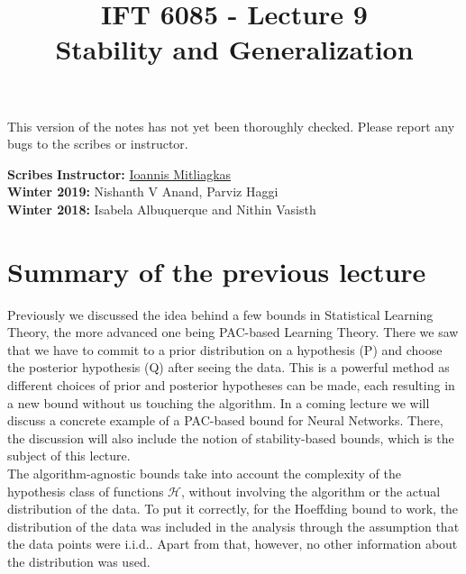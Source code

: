 \documentclass{article}
\title{IFT 6085 - Lecture 9 \\ Stability and Generalization}
\date{}
\begin{document}
 

\maketitle

\vspace{-0.5in}
\begin{center}
This version of the notes has not yet been thoroughly checked.
Please report any bugs to the scribes or instructor.
\end{center}
\vspace{0.2in}

\textbf{Scribes}\hfill
\textbf{Instructor:}  {\href{https://mitliagkas.github.io/}{Ioannis Mitliagkas}}\\
\textbf{Winter 2019:} Nishanth V Anand, Parviz Haggi\\
\textbf{Winter 2018:} Isabela Albuquerque and Nithin Vasisth



\newcommand{\infgc}{\inf_{g \in \mathcal{C}}}
\newcommand{\supgc}{\sup_{g \in \mathcal{C}}}

\newcommand{\Prob}{\mathbb{P}}
\newcommand{\E}{\mathbb{E}}
\newcommand{\reals}{\mathbb{R}}

\section{Summary of the previous lecture}
Previously we discussed the idea behind a few bounds in Statistical Learning Theory, the more advanced one being PAC-based Learning Theory. There we saw that we have to commit to a prior distribution on a hypothesis (P) and choose the posterior hypothesis (Q) after seeing the data. This is a powerful method as different choices of prior and posterior hypotheses can be made, each resulting in a new bound without us touching the algorithm. 
In a coming lecture we will discuss a concrete example of a PAC-based bound for Neural Networks. There, the discussion will also include the notion of stability-based bounds, which is the subject of this lecture.\\


The algorithm-agnostic bounds take into account the complexity of the hypothesis class of functions $\mathcal{H}$, without involving the algorithm or the actual distribution of the data. To put it correctly, for the Hoeffding bound to work, the distribution of the data was included in the analysis through the assumption that the data points were i.i.d.. Apart from that, however, no other information about the distribution was used. \\
\end{document}
